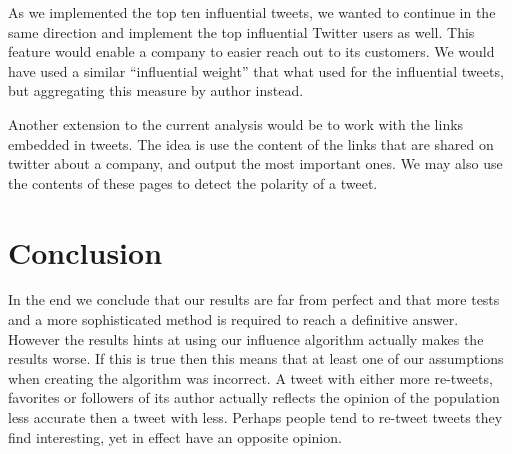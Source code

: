 \documentclass[a4paper,12pt]{report}
\begin{document}
As we implemented the top ten influential tweets, we wanted to continue in the same direction and implement the top influential Twitter users as well. This feature would enable a company to easier reach out to its customers. We would have used a similar “influential weight” that what used for the influential tweets, but aggregating this measure by author instead.

Another extension to the current analysis would be to work with the links embedded in tweets. The idea is use the content of the links that are shared on twitter about a company, and output the most important ones. We may also use the contents of these pages to detect the polarity of a tweet.

\section{Conclusion}

In the end we conclude that our results are far from perfect and that more tests and a more sophisticated method is required to reach a definitive answer. However the results hints at using our influence algorithm actually makes the results worse. If this is true then this means that at least one of our assumptions when creating the algorithm was incorrect. A tweet with either more re-tweets, favorites or followers of its author actually reflects the opinion of the population less accurate then a tweet with less. Perhaps people tend to re-tweet tweets they find interesting, yet in effect have an opposite opinion.
\end{document}
